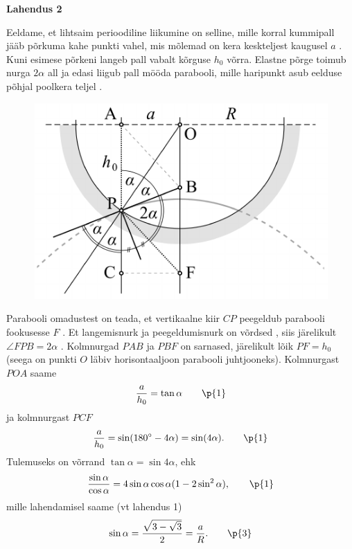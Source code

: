 \textbf{Lahendus 2}

Eeldame, et lihtsaim perioodiline liikumine on selline, mille korral kummipall jääb põrkuma kahe punkti vahel, mis mõlemad on kera keskteljest kaugusel $a$ . Kuni esimese põrkeni langeb pall vabalt kõrguse $h_0$ võrra. Elastne põrge toimub nurga $2\alpha$ all  ja edasi liigub pall mööda parabooli, mille haripunkt asub eelduse põhjal poolkera teljel .

\begin{figure}
\vspace{-1.1cm}
  \begin{center}
    \includegraphics[width=1\linewidth]{2024-v2g-10-yl2.pdf}
  \end{center}
  \vspace{-0.5cm}
\end{figure}

Parabooli omadustest on teada, et vertikaalne kiir $CP$ peegeldub parabooli fookusesse $F$ . Et langemisnurk ja peegeldumisnurk on võrdsed , siis järelikult $\angle{FPB}=2\alpha$ . Kolmnurgad $PAB$ ja $PBF$ on sarnased, järelikult lõik $PF=h_0$  (seega on punkti $O$ läbiv horisontaaljoon parabooli juhtjooneks). Kolmnurgast $POA$ saame
\[\frac{a}{h_0}=\tan\alpha\qquad \p{1}\]
ja kolmnurgast $PCF$
\[\frac{a}{h_0}=\sin(180^\circ-4\alpha)=\sin(4\alpha). \qquad \p{1}\]
Tulemuseks on võrrand $\tan\alpha=\sin 4\alpha$, ehk
\[\frac{\sin\alpha}{\cos\alpha}=4\sin\alpha\cos\alpha(1-2\sin^2\alpha), \qquad \p{1}\]
mille lahendamisel saame (vt lahendus 1)
\[\sin\alpha=\frac{\sqrt{3-\sqrt{3}}}{2}=\frac{a}{R}. \qquad \p{3}\]
\probend